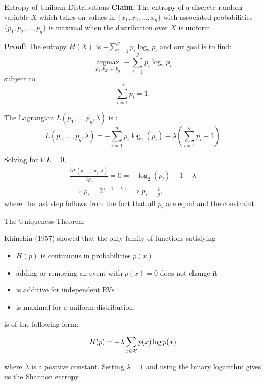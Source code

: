\documentclass[11pt,compress,t,notes=noshow, xcolor=table]{beamer}
\begin{document}
\begin{vbframe}{Entropy of Uniform Distributions}
\textbf{Claim}: The entropy of a discrete random variable $X$ which takes on values in $\{x_1,x_2, \ldots, x_g\}$ with associated probabilities $\{p_1,p_2, \ldots, p_g\}$ is maximal when the distribution over $X$ is uniform.

\lz
\textbf{Proof}: The entropy $H(X)$ is $- \sum_{i=1}^g p_i \log_2 p_i$ and our goal is to find:
  $$\underset{p_{1}, p_{2}, \ldots, p_{g}}{\operatorname{argmax}}-\sum_{i=1}^{g} p_{i} \log _{2} p_{i}$$
  subject to
  $$\sum_{i=1}^g p_i = 1.$$
  
  \framebreak
  The Lagrangian $L(p_1, \ldots, p_g, \lambda)$ is :
  $$L(p_1, \ldots, p_g, \lambda) = - \sum_{i=1}^g p_i \log_2(p_i) - \lambda \left( \sum_{i=1}^g p_i - 1 \right)$$
  
  Solving for $\nabla L = 0$,
  \begin{gather*}
    \frac{\partial L(p_1, \ldots, p_g, \lambda)}{\partial p_i} = 0 = - \log_2(p_i) - 1 - \lambda \\
    \implies p_i = 2^{(-1 - \lambda)} \implies p_i = \frac{1}{g},
  \end{gather*}
  where the last step follows from the fact that all $p_i$ are equal and the constraint.

\end{vbframe}

\begin{vbframe}{The Uniqueness Theorem}

Khinchin (1957) showed that the only family of functions satisfying
\begin{itemize}
  \item $H(p)$ is continuous in probabilities $p(x)$
  \item adding or removing an event with $p(x)=0$ does not change it
  \item is additive for independent RVs
  \item is maximal for a uniform distribution.
\end{itemize}

is of the following form:

$$ H(p) = - \lambda \sum_{x \in \mathcal{X}} p(x) \log p(x) $$ 

where $\lambda$ is a positive constant. Setting $\lambda = 1$ and using the binary logarithm gives us the Shannon entropy.
\end{vbframe}


\endlecture
\end{document}
